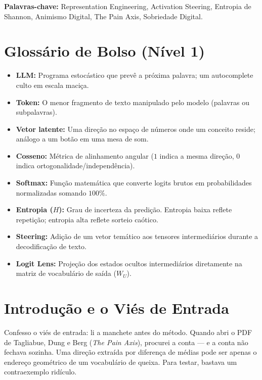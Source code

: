 \documentclass[11pt,a4paper]{article}
\begin{document}
\noindent\textbf{\footnotesize Palavras-chave:} \footnotesize Representation Engineering, Activation Steering, Entropia de Shannon, Animismo Digital, The Pain Axis, Sobriedade Digital.

\vspace{0.2cm}
\section*{Glossário de Bolso (Nível 1)}
\begin{itemize}\footnotesize
    \item \textbf{LLM:} Programa estocástico que prevê a próxima palavra; um autocomplete culto em escala maciça.
    \item \textbf{Token:} O menor fragmento de texto manipulado pelo modelo (palavras ou subpalavras).
    \item \textbf{Vetor latente:} Uma direção no espaço de números onde um conceito reside; análogo a um botão em uma mesa de som.
    \item \textbf{Cosseno:} Métrica de alinhamento angular ($1$ indica a mesma direção, $0$ indica ortogonalidade/independência).
    \item \textbf{Softmax:} Função matemática que converte logits brutos em probabilidades normalizadas somando $100\%$.
    \item \textbf{Entropia ($H$):} Grau de incerteza da predição. Entropia baixa reflete repetição; entropia alta reflete sorteio caótico.
    \item \textbf{Steering:} Adição de um vetor temático aos tensores intermediários durante a decodificação de texto.
    \item \textbf{Logit Lens:} Projeção dos estados ocultos intermediários diretamente na matriz de vocabulário de saída ($W_U$).
\end{itemize}

\newpage
\section{Introdução e o Viés de Entrada}

Confesso o viés de entrada: li a manchete antes do método. Quando abri o PDF de Tagliabue, Dung e Berg (\textit{The Pain Axis}), procurei a conta --- e a conta não fechava sozinha. Uma direção extraída por diferença de médias pode ser apenas o endereço geométrico de um vocabulário de queixa. Para testar, bastava um contraexemplo ridículo.
\end{document}
